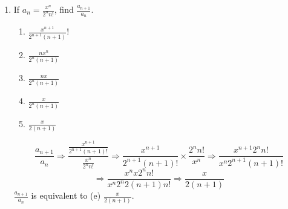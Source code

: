 \documentclass{article}
\begin{document}
\begin{enumerate}
\item If $a_{n} = \frac{x^{n}}{2^{n}n!}$, find $\frac{a_{n + 1}}{a_{n}}$.
    \begin{enumerate}
    \item $\frac{x^{n + 1}}{2^{n + 1}(n + 1)}$!
    \item $\frac{nx^{n}}{2^{n}(n + 1)}$
    \item $\frac{nx}{2^{n}(n + 1)}$
    \item $\frac{x}{2^{n}(n + 1)}$
    \item $\frac{x}{2(n + 1)}$
    \end{enumerate}

\[\frac{a_{n + 1}}{a_{n}} \Longrightarrow \frac{\frac{x^{n + 1}}{2^{n + 1}(n + 1)!}}{\frac{x^{n}}{2^{n}n!}}
    \Longrightarrow \frac{x^{n + 1}}{2^{n + 1}(n + 1)!}\times\frac{2^{n}n!}{x^{n}}
    \Longrightarrow \frac{x^{n + 1}2^{n}n!}{x^{n}2^{n + 1}(n + 1)!}\]
\[\Longrightarrow \frac{x^{n}x2^{n}n!}{x^{n}2^{n}2(n + 1)n!}
    \Longrightarrow \frac{x}{2(n + 1)}\]
$\frac{a_{n + 1}}{a_{n}}$ is equivalent to (e) $\frac{x}{2(n + 1)}$.
\end{enumerate}

\pagebreak
\end{document}
